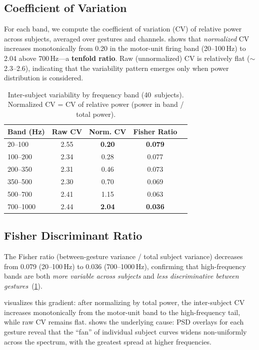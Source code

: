 \documentclass[conference]{IEEEtran}
\begin{document}
\subsection{Coefficient of Variation}
For each band, we compute the coefficient of variation (CV) of relative power across subjects, averaged over gestures and channels.
 shows that \emph{normalized} CV increases monotonically from 0.20 in the motor-unit firing band (20--100\,Hz) to 2.04 above 700\,Hz---a \textbf{tenfold ratio}.
Raw (unnormalized) CV is relatively flat ($\sim$2.3--2.6), indicating that the variability pattern emerges only when power distribution is considered.

\begin{table}[t]
\centering
\caption{Inter-subject variability by frequency band (40~subjects). Normalized CV = CV of relative power (power in band / total power).}
\label{tab:h1_cv}
\begin{tabular}{lcccc}
\toprule
Band (Hz) & Raw CV & Norm. CV & Fisher Ratio \\
\midrule
20--100   & 2.55 & \textbf{0.20} & \textbf{0.079} \\
100--200  & 2.34 & 0.28 & 0.077 \\
200--350  & 2.31 & 0.46 & 0.073 \\
350--500  & 2.30 & 0.70 & 0.069 \\
500--700  & 2.41 & 1.15 & 0.063 \\
700--1000 & 2.44 & \textbf{2.04} & \textbf{0.036} \\
\bottomrule
\end{tabular}
\end{table}

\subsection{Fisher Discriminant Ratio}
The Fisher ratio (between-gesture variance / total subject variance) decreases from 0.079 (20--100\,Hz) to 0.036 (700--1000\,Hz), confirming that high-frequency bands are both \emph{more variable across subjects} and \emph{less discriminative between gestures}~(\cref{tab:h1_cv}).

 visualizes this gradient: after normalizing by total power, the inter-subject CV increases monotonically from the motor-unit band to the high-frequency tail, while raw CV remains flat.
 shows the underlying cause: PSD overlays for each gesture reveal that the ``fan'' of individual subject curves widens non-uniformly across the spectrum, with the greatest spread at higher frequencies.
\end{document}
